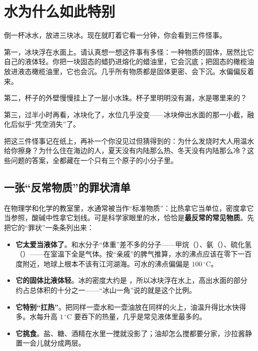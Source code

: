 \chapter{水为什么如此特别}

\begin{kaichang}
倒一杯冰水，放进三块冰。现在就盯着它看一分钟，你会看到三件怪事。

第一，冰块浮在水面上。请认真想一想这件事有多怪：一种物质的固体，居然比它自己的液体轻。你把一块固态的蜡扔进熔化的蜡油里，它会沉底；把固态的橄榄油放进液态橄榄油里，它也会沉。几乎所有物质都是固体更密、会下沉。水偏偏反着来。

第二，杯子的外壁慢慢挂上了一层小水珠。杯子里明明没有漏，水是哪里来的？

第三，过半小时再看，冰块化了，水位几乎没变——冰块伸出水面的那一小截，融化后似乎“凭空消失”了。

把这三件怪事记在纸上，再补一个你没见过但猜得到的：为什么发烧时大人用温水给你擦身？为什么住在海边的人，夏天没有内陆那么热、冬天没有内陆那么冷？这些问题的答案，全都藏在一个只有三个原子的小分子里。
\end{kaichang}

\section{一张“反常物质”的罪状清单}

在物理学和化学的教室里，水通常被当作“标准物质”：比热拿它当单位，密度拿它当参照，酸碱中性拿它划线。可是科学家眼里的水，恰恰是\textbf{最反常的常见物质}。先把它的“罪状”一条条列出来：

\begin{itemize}[itemsep=2pt]
\item \textbf{它太爱当液体了}。和水分子“体重”差不多的分子——甲烷（）、氨（）、硫化氢（）——在室温下全是气体。按“亲戚”的脾气推算，水的沸点应该在零下一百度附近，地球上根本不该有江河湖海。可水的沸点偏偏是 $100\,^{\circ}\mathrm{C}$。
\item \textbf{它的固体比液体轻}。冰的密度大约是 ，所以冰块浮在水上，高出水面的部分约占总体积的十分之一——“冰山一角”说的就是这个比例。
\item \textbf{它特别“扛热”}。把同样一壶水和一壶油放在同样的火上，油温升得比水快得多。水每升高 $1\,^{\circ}\mathrm{C}$ 要吞下的热量，几乎是常见液体里最多的。
\item \textbf{它挑食}。盐、糖、酒精在水里一搅就没影了；油却怎么搅都要分家，沙拉酱静置一会儿就分成两层。
\end{itemize}


